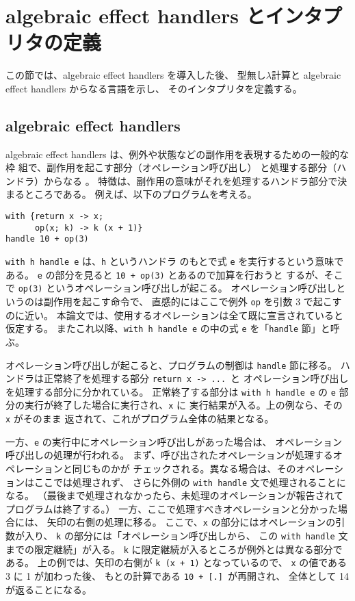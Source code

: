 \section{algebraic effect handlers とインタプリタの定義}
\label{section:definition}

この節では、algebraic effect handlers を導入した後、
型無し$\lambda$計算と algebraic effect handlers からなる言語を示し、
そのインタプリタを定義する。

\subsection{algebraic effect handlers}
\label{subsection:algebraic effect handlers}

algebraic effect handlers は、例外や状態などの副作用を表現するための一般的な枠
組で、副作用を起こす部分（オペレーション呼び出し）
と処理する部分（ハンドラ）からなる \cite{PRETNAR201519}。
特徴は、副作用の意味がそれを処理するハンドラ部分で決まるところである。
例えば、以下のプログラムを考える。
\begin{verbatim}
with {return x -> x;
      op(x; k) -> k (x + 1)}
handle 10 + op(3)
\end{verbatim}
\texttt{with h handle e} は、\texttt{h} というハンドラ
のもとで式 \texttt{e} を実行するという意味である。
\texttt{e} の部分を見ると \texttt{10 + op(3)} とあるので加算を行おうと
するが、そこで \texttt{op(3)} というオペレーション呼び出しが起こる。
オペレーション呼び出しというのは副作用を起こす命令で、
直感的にはここで例外 \texttt{op} を引数 3 で起こすのに近い。
本論文では、使用するオペレーションは全て既に宣言されていると仮定する。
またこれ以降、\texttt{with h handle e} の中の式 \texttt{e} を「\texttt{handle} 節」と呼ぶ。

オペレーション呼び出しが起こると、プログラムの制御は \texttt{handle} 節に移る。
ハンドラは正常終了を処理する部分 \texttt{return x -> ...}\ と
オペレーション呼び出しを処理する部分に分かれている。
正常終了する部分は
\texttt{with h handle e}
の \texttt{e} 部分の実行が終了した場合に実行され、\texttt{x} に
実行結果が入る。上の例なら、その \texttt{x} がそのまま
返されて、これがプログラム全体の結果となる。

一方、\texttt{e} の実行中にオペレーション呼び出しがあった場合は、
オペレーション呼び出しの処理が行われる。
まず、呼び出されたオペレーションが処理するオペレーションと同じものかが
チェックされる。異なる場合は、そのオペレーションはここでは処理されず、
さらに外側の \texttt{with handle} 文で処理されることになる。
（最後まで処理されなかったら、未処理のオペレーションが報告されて
プログラムは終了する。）
一方、ここで処理すべきオペレーションと分かった場合には、
矢印の右側の処理に移る。
ここで、\texttt{x} の部分にはオペレーションの引数が入り、
\texttt{k} の部分には「オペレーション呼び出しから、
この \texttt{with handle} 文までの限定継続」が入る。
\texttt{k} に限定継続が入るところが例外とは異なる部分である。
上の例では、矢印の右側が \texttt{k (x + 1)} となっているので、
\texttt{x} の値である 3 に 1 が加わった後、
もとの計算である \texttt{10 + [.]}\ が再開され、
全体として 14 が返ることになる。


